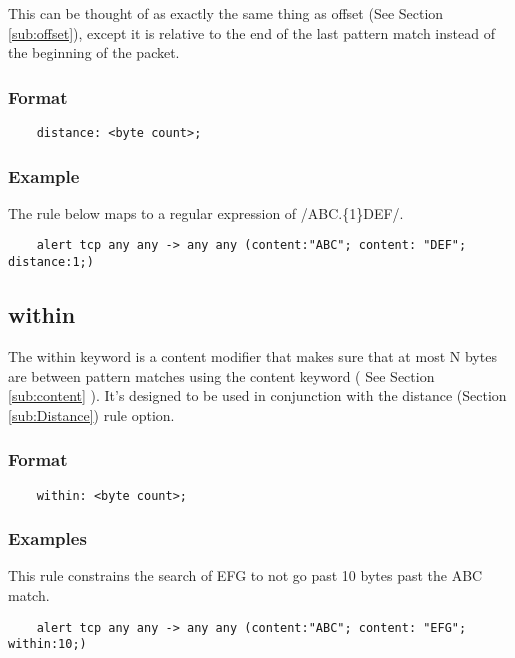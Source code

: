 \documentclass[english]{report}
\begin{document}
This can be thought of as exactly the same thing as offset (See Section
\ref{sub:offset}), except it is relative to the end of the last pattern match
instead of the beginning of the packet.

\subsubsection{Format}

\begin{verbatim}
    distance: <byte count>;
\end{verbatim}

\subsubsection{Example}

The rule below maps to a regular expression of /ABC.\{1\}DEF/.

\begin{verbatim}
    alert tcp any any -> any any (content:"ABC"; content: "DEF"; distance:1;)
\end{verbatim}

\subsection{within}
\label{sub:Within}

The within keyword is a content modifier that makes sure that at most N bytes
are between pattern matches using the content keyword ( See Section
\ref{sub:content} ).  It's designed to be used in conjunction with the distance
(Section \ref{sub:Distance}) rule option.

\subsubsection{Format}

\begin{verbatim}
    within: <byte count>;
\end{verbatim}

\subsubsection{Examples}

This rule constrains the search of EFG to not go past 10 bytes past the ABC match. 

\begin{verbatim}
    alert tcp any any -> any any (content:"ABC"; content: "EFG"; within:10;)
\end{verbatim}
\end{document}
